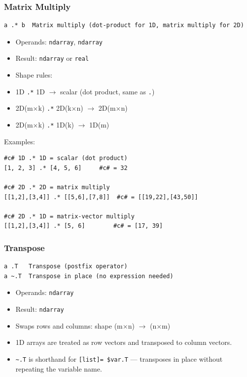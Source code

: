 \documentclass{report}
\begin{document}
\subsubsection{Matrix Multiply}
\begin{verbatim}
a .* b  Matrix multiply (dot-product for 1D, matrix multiply for 2D)
\end{verbatim}

\begin{itemize}
\item Operands: \texttt{ndarray}, \texttt{ndarray}
\item Result: \texttt{ndarray} or \texttt{real}
\item Shape rules:
  \item 1D \texttt{.*} 1D $\rightarrow$ scalar (dot product, same as \texttt{.})
  \item 2D(m$\times$k) \texttt{.*} 2D(k$\times$n) $\rightarrow$ 2D(m$\times$n)
  \item 2D(m$\times$k) \texttt{.*} 1D(k) $\rightarrow$ 1D(m)
\end{itemize}

Examples:
\begin{verbatim}
#c# 1D .* 1D = scalar (dot product)
[1, 2, 3] .* [4, 5, 6]     #c# = 32

#c# 2D .* 2D = matrix multiply
[[1,2],[3,4]] .* [[5,6],[7,8]]  #c# = [[19,22],[43,50]]

#c# 2D .* 1D = matrix-vector multiply
[[1,2],[3,4]] .* [5, 6]        #c# = [17, 39]
\end{verbatim}

\subsubsection{Transpose}
\begin{verbatim}
a .T   Transpose (postfix operator)
a ~.T  Transpose in place (no expression needed)
\end{verbatim}

\begin{itemize}
\item Operands: \texttt{ndarray}
\item Result: \texttt{ndarray}
\item Swaps rows and columns: shape (m$\times$n) $\rightarrow$ (n$\times$m)
\item 1D arrays are treated as row vectors and transposed to column vectors.
\item \texttt{\textasciitilde.T} is shorthand for \texttt{[list]= \$var.T} — transposes in place without repeating the variable name.
\end{itemize}
\end{document}
